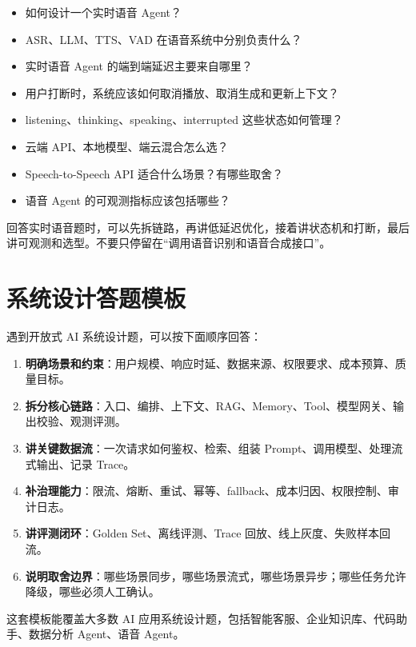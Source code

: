 \documentclass[9pt,a4paper,twocolumn]{ctexart}
\begin{document}
\begin{itemize}[itemsep=1pt, topsep=2pt]
  \item 如何设计一个实时语音 Agent？
  \item ASR、LLM、TTS、VAD 在语音系统中分别负责什么？
  \item 实时语音 Agent 的端到端延迟主要来自哪里？
  \item 用户打断时，系统应该如何取消播放、取消生成和更新上下文？
  \item listening、thinking、speaking、interrupted 这些状态如何管理？
  \item 云端 API、本地模型、端云混合怎么选？
  \item Speech-to-Speech API 适合什么场景？有哪些取舍？
  \item 语音 Agent 的可观测指标应该包括哪些？
\end{itemize}


回答实时语音题时，可以先拆链路，再讲低延迟优化，接着讲状态机和打断，最后讲可观测和选型。不要只停留在“调用语音识别和语音合成接口”。



\section*{系统设计答题模板}


遇到开放式 AI 系统设计题，可以按下面顺序回答：


\begin{enumerate}[itemsep=1pt, topsep=2pt]
  \item \textbf{明确场景和约束}：用户规模、响应时延、数据来源、权限要求、成本预算、质量目标。
  \item \textbf{拆分核心链路}：入口、编排、上下文、RAG、Memory、Tool、模型网关、输出校验、观测评测。
  \item \textbf{讲关键数据流}：一次请求如何鉴权、检索、组装 Prompt、调用模型、处理流式输出、记录 Trace。
  \item \textbf{补治理能力}：限流、熔断、重试、幂等、fallback、成本归因、权限控制、审计日志。
  \item \textbf{讲评测闭环}：Golden Set、离线评测、Trace 回放、线上灰度、失败样本回流。
  \item \textbf{说明取舍边界}：哪些场景同步，哪些场景流式，哪些场景异步；哪些任务允许降级，哪些必须人工确认。
\end{enumerate}


这套模板能覆盖大多数 AI 应用系统设计题，包括智能客服、企业知识库、代码助手、数据分析 Agent、语音 Agent。
\end{document}
